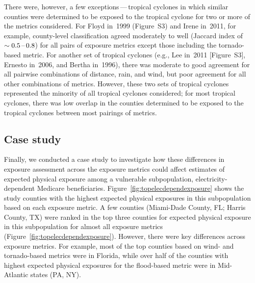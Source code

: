 \begin{comment}
Storms are displayed within
clusters that have similar patterns in county-level exposure agreement for
metric pairs, based on hierarchical clustering using the complete link
method~\parencite{murtagh2012algorithms} (i.e., storms in the same cluster tend
to have similar patterns for the pairwise strength of agreement among metrics);
columns are also ordered based on hierarchical clustering. 
Maps are
available showing the counties identified as exposed under each of five metrics
for the widest-extent storm in each cluster: Hurricane Ivan in~2004
(Figure~\ref{fig:ivanexposure}) and Hurricanes Floyd in~1999, Lee in~2011, Cindy
in~2005, and Katrina in~2005 (Figure~S3).
\end{comment}

There were, however, a few exceptions\,---\,tropical cyclones in which similar
counties were determined to be exposed to the tropical cyclone for two or more
of the metrics considered.  For Floyd in~1999 (Figure~S3) and Irene in~2011,
for example, county-level classification agreed moderately to well (Jaccard
index of~$\sim 0.5\mbox{\,--\,}0.8$) for all pairs of exposure metrics except
those including the tornado-based metric. For another set of tropical cyclones
(e.g., Lee in~2011 [Figure~S3], Ernesto in~2006, and Bertha in~1996), there was
moderate to good agreement for all pairwise combinations of distance, rain, and
wind, but poor agreement for all other combinations of metrics. However, these
two sets of tropical cyclones represented the minority of all tropical cyclones
considered; for most tropical cyclones, there was low overlap in the counties
determined to be exposed to the tropical cyclones between most pairings of
metrics.

\subsection*{Case study}

Finally, we conducted a case study to investigate how these differences in
exposure assessment across the exposure metrics could affect estimates of
expected physical exposure among a vulnerable subpopulation,
electricity-dependent Medicare beneficiaries.
Figure~\ref{fig:topelecdependexposure} shows the study counties with the
highest expected physical exposures in this subpopulation based on each
exposure metric. A few counties (Miami-Dade County, FL; Harris County, TX) were
ranked in the top three counties for expected physical exposure in this
subpopulation for almost all exposure metrics
(Figure~\ref{fig:topelecdependexposure}). However, there were key differences
across exposure metrics. For example, most of the top counties based on wind-
and tornado-based metrics were in Florida, while over half of the counties with
highest expected physical exposures for the flood-based metric were in
Mid-Atlantic states (PA, NY).



